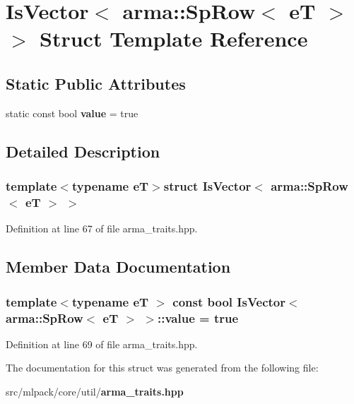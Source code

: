 \section{Is\-Vector$<$ arma\-:\-:Sp\-Row$<$ e\-T $>$ $>$ Struct Template Reference}
\label{structIsVector_3_01arma_1_1SpRow_3_01eT_01_4_01_4}
\subsection*{Static Public Attributes}
\begin{DoxyCompactItemize}
\item 
static const bool {\bf value} = true
\end{DoxyCompactItemize}


\subsection{Detailed Description}
\subsubsection*{template$<$typename e\-T$>$struct Is\-Vector$<$ arma\-::\-Sp\-Row$<$ e\-T $>$ $>$}



Definition at line 67 of file arma\-\_\-traits.\-hpp.



\subsection{Member Data Documentation}
\subsubsection[{value}]{\setlength{\rightskip}{0pt plus 5cm}template$<$typename e\-T $>$ const bool {\bf Is\-Vector}$<$ arma\-::\-Sp\-Row$<$ e\-T $>$ $>$\-::value = true\hspace{0.3cm}{\ttfamily [static]}}\label{structIsVector_3_01arma_1_1SpRow_3_01eT_01_4_01_4_ae34a53ab0f3ad0e317a28cee06e5c596}


Definition at line 69 of file arma\-\_\-traits.\-hpp.



The documentation for this struct was generated from the following file\-:\begin{DoxyCompactItemize}
\item 
src/mlpack/core/util/{\bf arma\-\_\-traits.\-hpp}\end{DoxyCompactItemize}
